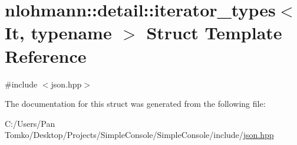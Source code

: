 \hypertarget{structnlohmann_1_1detail_1_1iterator__types}{}\section{nlohmann\+::detail\+::iterator\+\_\+types$<$ It, typename $>$ Struct Template Reference}
\label{structnlohmann_1_1detail_1_1iterator__types}


{\ttfamily \#include $<$json.\+hpp$>$}



The documentation for this struct was generated from the following file\+:\begin{DoxyCompactItemize}
\item 
C\+:/\+Users/\+Pan Tomko/\+Desktop/\+Projects/\+Simple\+Console/\+Simple\+Console/include/\mbox{\hyperlink{json_8hpp}{json.\+hpp}}\end{DoxyCompactItemize}

